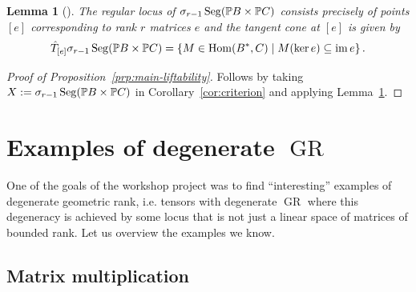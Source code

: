 \documentclass[a4paper,10pt]{article}
\def\set#1{\left\{#1\right\}}
\DeclareMathOperator{\Hom}{Hom}\let\hom\Hom
\DeclareMathOperator{\im}{im}
\DeclareMathOperator{\Seg}{Seg}
\DeclareMathOperator{\GR}{GR}
\def\uv#1{``#1''}
\newtheorem{lemma}[theorem]{Lemma}
\theoremstyle{definition}
\theoremstyle{remark}
\begin{document}
\begin{lemma}[{\cite[Lemma 9.]{draisma}}]
    \label{lem:secant-segre-tangent}
    The regular locus of $\sigma_{r-1}\Seg(\pe B\times\pe C)$ consists precisely of points $[e]$ corresponding to rank $r$ matrices $e$ and the tangent cone at $[e]$ is given by \[\hat T_{[e]}\sigma_{r-1}\Seg(\pe B\times\pe C) = \set{M\in \Hom(B^*, C)\mid M(\ker e)\subseteq \im e}.\]
\end{lemma}

\begin{proof}[Proof of Proposition~\ref{prp:main-liftability}]
    Follows by taking $X:= \sigma_{r-1} \Seg(\pe B\times\pe C)$ in Corollary~\ref{cor:criterion} and applying Lemma~\ref{lem:secant-segre-tangent}.
\end{proof}


























\section{Examples of degenerate $\GR$}
\label{sec:examples}

One of the goals of the workshop project was to find \uv{interesting} examples of degenerate geometric rank, i.e. tensors with degenerate $\GR$ where this degeneracy is achieved by some locus that is not just a linear space of matrices of bounded rank. Let us overview the examples we know.

\subsection{Matrix multiplication}
\end{document}
